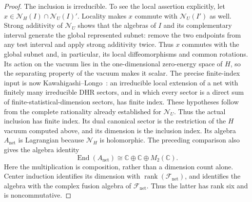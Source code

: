 \documentclass[11pt,a4paper]{article}
\theoremstyle{definition}
\begin{document}
\begin{proof}
The inclusion is irreducible.  To see the local assertion explicitly,
let $x\in\mathcal N_H(I)\cap\mathcal N_U(I)'$.  Locality makes $x$
commute with $\mathcal N_U(I')$ as well.  Strong additivity of
$\mathcal N_U$ shows that the algebras of $I$ and its complementary
interval generate the global represented subnet: remove the two
endpoints from any test interval and apply strong additivity twice.
Thus $x$ commutes with the global subnet and, in particular, its local
diffeomorphisms and common rotations.  Its action on the vacuum lies
in the one-dimensional zero-energy space of $H$, so the separating
property of the vacuum makes it scalar.  The precise finite-index
input is now
Kawahigashi--Longo~\cite[Proposition~2.3]{KL}: an irreducible local extension
of a net with finitely many irreducible DHR sectors, and in which every
sector is a direct sum of finite-statistical-dimension sectors, has
finite index.  These hypotheses follow
from the complete rationality already established for $\mathcal N_U$.
Thus the actual inclusion has finite index.  Its dual canonical sector
is the restriction of the $H$ vacuum computed above, and its dimension
is the inclusion index.  Its algebra $A_{\mathrm{net}}$ is Lagrangian because
$\mathcal N_H$ is holomorphic.  The preceding comparison also gives
the algebra identity
\begin{equation}
 \operatorname{End}(A_{\mathrm{net}})
 \cong\mathbb C\oplus\mathbb C\oplus M_2(\mathbb C).
 \label{eq:analytic-end-algebra}
\end{equation}
Here the multiplication is composition, rather than a dimension count
alone.  Center induction identifies its dimension with
$\operatorname{rank}(\mathcal F_{\mathrm{net}})$, and identifies the
algebra with the complex fusion algebra of
$\mathcal F_{\mathrm{net}}$.  Thus the latter has rank six and is
noncommutative.


\end{proof}
\end{document}
